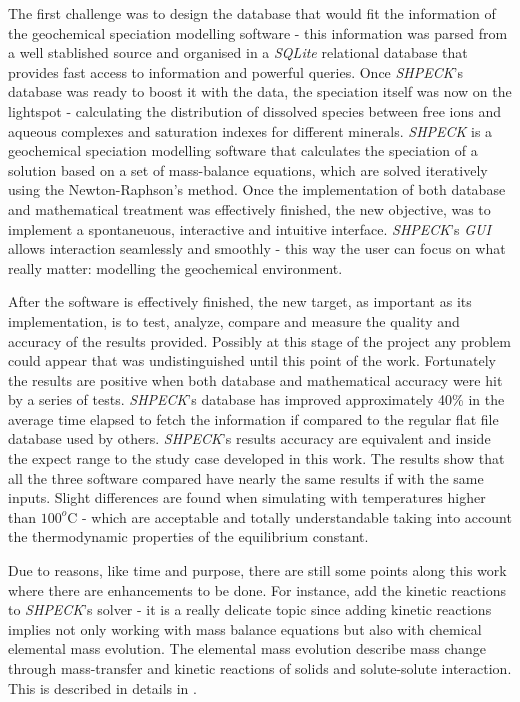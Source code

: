 The first challenge was to design the database that would fit the information of the geochemical speciation modelling software - this information was parsed from a well stablished source and organised in a \emph{SQLite} relational database that provides fast access to information and powerful queries. Once \emph{SHPECK}'s database was ready to boost it with the data, the speciation itself was now on the lightspot - calculating the distribution of dissolved species between free ions and aqueous complexes and saturation indexes for different minerals. \emph{SHPECK} is a geochemical speciation modelling software that calculates the speciation of a solution based on a set of mass-balance equations, which are solved iteratively using the Newton-Raphson's method.
Once the implementation of both database and mathematical treatment was effectively finished, the new objective, was to implement a spontaneuous, interactive and intuitive interface. \emph{SHPECK}'s \emph{GUI} allows interaction seamlessly and smoothly - this way the user can focus on what really matter: modelling the geochemical environment.

After the software is effectively finished, the new target, as important as its implementation, is to test, analyze, compare and measure the quality and accuracy of the results provided. Possibly at this stage of the project any problem could appear that was undistinguished until this point of the work. 
Fortunately the results are positive when both database and mathematical accuracy were hit by a series of tests. 
\emph{SHPECK}'s database has improved approximately 40\% in the average time elapsed to fetch the  information if compared to the regular flat file database used by others. 
\emph{SHPECK}'s results accuracy are equivalent and inside the expect range to the study case developed in this work. The results show that all the three software compared have nearly the same results if with the same inputs. Slight differences are found when simulating with temperatures higher than $100^o$C - which are acceptable and totally understandable taking into account the thermodynamic properties of the equilibrium constant.

Due to reasons, like time and purpose, there are still some points along this work where there are enhancements to be done. For instance, add the kinetic reactions to \emph{SHPECK}'s solver - it is a really delicate topic since adding kinetic reactions implies not only working with mass balance equations but also with chemical elemental mass evolution. The elemental mass evolution describe mass change through mass-transfer and kinetic reactions of solids and solute-solute interaction. This is described in details in \cite{Ajpark:14}.

